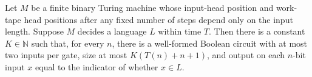 \begin{theorem}
\label{Complexity.exists_tableau_circuit}
\leanok
{}
Let $M$ be a finite binary Turing machine whose input-head position and work-tape head
positions after any fixed number of steps depend only on the input length. Suppose $M$
decides a language $L$ within time $T$. Then there is a constant $K\in\mathbb{N}$ such
that, for every $n$, there is a well-formed Boolean circuit with at most two inputs per
gate, size at most $K(T(n)+n+1)$, and output on each $n$-bit input $x$ equal to the
indicator of whether $x\in L$.
\end{theorem}
